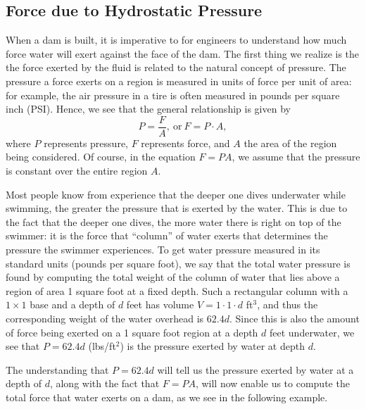 

\subsection*{Force due to Hydrostatic Pressure} 

When a dam is built, it is imperative to for engineers to understand how much force water will exert against the face of the dam.  The first thing we realize is the the force exerted by the fluid is related to the natural concept of pressure.  The pressure a force exerts on a region is measured in units of force per unit of area:  for example, the air pressure in a tire is often measured in pounds per square inch (PSI).  Hence, we see that the general relationship is given by
$$P = \frac{F}{A}, \ \mbox{or} \ F = P \cdot A,$$
where $P$ represents pressure, $F$ represents force, and $A$ the area of the region being considered.  Of course, in the equation $F = PA$, we assume that the pressure is constant over the entire region $A$.

Most people know from experience that the deeper one dives underwater while swimming, the greater the pressure that is exerted by the water.  This is due to the fact that the deeper one dives, the more water there is right on top of the swimmer:  it is the force that ``column'' of water exerts that determines the pressure the swimmer experiences.  To get water pressure measured in its standard units (pounds per square foot), we say that the total water pressure is found by computing the total weight of the column of water that lies above a region of area 1 square foot at a fixed depth.  Such a rectangular column with a $1 \times 1$ base and a depth of $d$ feet has volume $V = 1 \cdot 1 \cdot d$ ft$^3$, and thus the corresponding weight of the water overhead is $62.4d$.  Since this is also the amount of force being exerted on a 1 square foot region at a depth $d$ feet underwater, we see that $P = 62.4 d$ (lbs/ft$^2$) is the pressure exerted by water at depth $d$.

The understanding that $P = 62.4d$ will tell us the pressure exerted by water at a depth of $d$, along with the fact that $F = PA$, will now enable us to compute the total force that water exerts on a dam, as we see in the following example.

